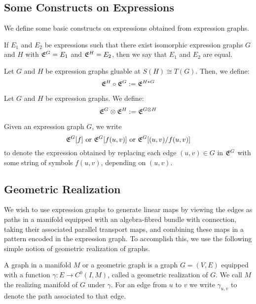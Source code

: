 \documentclass[./Thick_TQFTs_and_Quantum_Information.tex]{subfiles}
\begin{document}

\subsection{Some Constructs on Expressions}

We define some basic constructs on expressions obtained from expression graphs.

\begin{defn}
If $E_1$ and $E_2$ be expressions such that there exist isomorphic
expression graphs $G$ and $H$ with $\mathfrak{E}^{G} = E_1$ and
$\mathfrak{E}^{H} = E_2$, then we say that $E_1$ and $E_2$ are equal.
\end{defn}

\begin{defn}
Let $G$ and $H$ be expression graphs gluable at $S(H) \cong T(G)$. Then, we
define:
\[
  \mathfrak{E}^{H} \circ \mathfrak{E}^{G} := \mathfrak{E}^{H * G}
\]
\end{defn}

\begin{defn}
Let $G$ and $H$ be expression graphs. We define:
\[
  \mathfrak{E}^{G} \otimes \mathfrak{E}^{H} := \mathfrak{E}^{G \otimes H}
\]
\end{defn}

\begin{defn}
Given an expression graph $G$, we write
\[
  \mathfrak{E}^{G}[f] \text{ or } \mathfrak{E}^{G}[f(u, v)] \text{ or } \mathfrak{E}^{G}[(u, v)/f(u, v)]
\]
to denote the expression obtained by replacing each edge $(u, v) \in G$ in
$\mathfrak{E}^{G}$ with some string of symbols $f(u, v)$, depending on $(u, v)$.
\end{defn}

\subsection{Geometric Realization}

We wish to use expression graphs to generate linear maps by viewing the edges as
paths in a manifold equipped with an algebra-fibred bundle with connection,
taking their associated parallel transport maps, and combining these maps in a
pattern encoded in the expression graph. To accomplish this, we use the
following simple notion of geometric realization of graphs.

\begin{defn}
A graph in a manifold $M$ or a geometric graph is a graph $G = (V, E)$ equipped
with a function $\gamma : E \to C^0(I, M)$, called a geometric realization of
$G$. We call $M$ the realizing manifold of $G$ under $\gamma$. For an edge from
$u$ to $v$ we write $\gamma_{u, v}$ to denote the path associated to that edge.
\end{defn}
\end{document}
